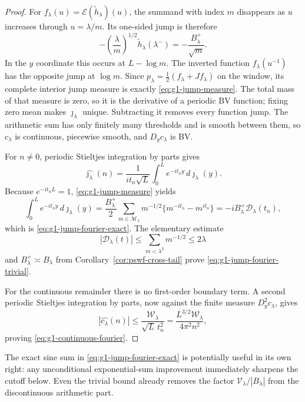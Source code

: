\documentclass[11pt]{article}
\theoremstyle{remark}
\begin{document}
\begin{proof}
For
$f_\lambda(u)=\mathcal E(\widetilde h_\lambda)(u)$, the summand with index
$m$ disappears as $u$ increases through $u=\lambda/m$.  Its one-sided jump is
therefore
\[
 -\left(\frac\lambda m\right)^{1/2}
  \widetilde h_\lambda(\lambda^-)
 =-\frac{B_\lambda^{+}}{\sqrt m}.
\]
In the $y$ coordinate this occurs at $L-\log m$.  The inverted function
$f_\lambda(u^{-1})$ has the opposite jump at $\log m$.  Since
$p_\lambda=\frac12(f_\lambda+Jf_\lambda)$ on the window, its complete
interior jump measure is exactly \eqref{eq:g1-jump-measure}.  The total mass
of that measure is zero, so it is the derivative of a periodic BV function;
fixing zero mean makes $\jmath_\lambda$ unique.  Subtracting it removes every
function jump.  The arithmetic sum has only finitely many thresholds and is
smooth between them, so $c_\lambda$ is continuous, piecewise smooth, and
$D_yc_\lambda$ is BV.

For $n\ne0$, periodic Stieltjes integration by parts gives
\[
 \widehat{\jmath_\lambda}(n)
 =\frac1{it_n\sqrt L}
 \int_0^Le^{-it_ny}\,d\jmath_\lambda(y).
\]
Because $e^{-it_nL}=1$, \eqref{eq:g1-jump-measure} yields
\[
 \int_0^Le^{-it_ny}\,d\jmath_\lambda(y)
 =\frac{B_\lambda^{+}}2
 \sum_{m\in\mathcal M_\lambda}m^{-1/2}
 \{m^{-it_n}-m^{it_n}\}
 =-iB_\lambda^{+}\mathcal D_\lambda(t_n),
\]
which is \eqref{eq:g1-jump-fourier-exact}.  The elementary estimate
\[
 |\mathcal D_\lambda(t)|
 \le\sum_{m<\lambda^2}m^{-1/2}\le2\lambda
\]
and $B_\lambda^{+}\asymp B_\lambda$ from
Corollary~\ref{cor:pswf-cross-tail} prove
\eqref{eq:g1-jump-fourier-trivial}.

For the continuous remainder there is no first-order boundary term.  A second
periodic Stieltjes integration by parts, now against the finite measure
$D_y^2c_\lambda$, gives
\[
 |\widehat{c_\lambda}(n)|
 \le\frac{\mathcal W_\lambda}{\sqrt L\,t_n^2}
 =\frac{L^{3/2}\mathcal W_\lambda}{4\pi^2n^2},
\]
proving \eqref{eq:g1-continuous-fourier}.
\end{proof}

The exact sine sum in \eqref{eq:g1-jump-fourier-exact} is potentially useful
in its own right: any unconditional exponential-sum improvement immediately
sharpens the cutoff below.  Even the trivial bound already removes the
factor $\mathcal V_\lambda/|B_\lambda|$ from the discontinuous arithmetic
part.
\end{document}
